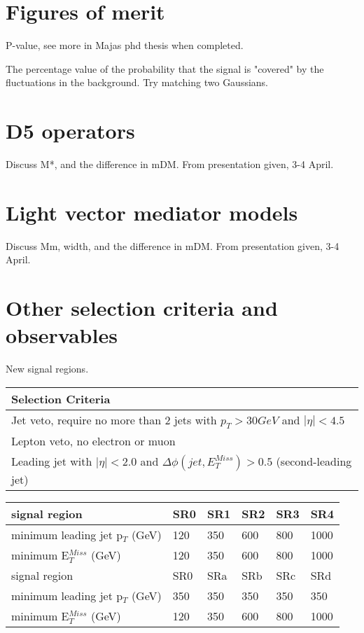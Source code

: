 \section{Figures of merit}
P-value, see more in Majas phd thesis when completed.

The percentage value of the probability that the signal is "covered" by the fluctuations in the background. Try matching two Gaussians.
\section{D5 operators}
Discuss M*, and the difference in mDM. From presentation given, 3-4 April. 
\section{Light vector mediator models}
Discuss Mm, width, and the difference in mDM. From presentation given, 3-4 April.
\section{Other selection criteria and observables}
New signal regions.
\begin{table}[h]
\begin{center}
\begin{tabular}{l}
\hline
Selection Criteria \\ \hline
Jet veto, require no more than 2 jets with $p_T > 30 GeV$ and $|\eta| < 4.5$ \\
Lepton veto, no electron or muon \\
Leading jet with $|\eta| < 2.0$ and $\Delta \phi (jet, E_T^{Miss})>0.5$ (second-leading jet) \\ \hline
\end{tabular}
\begin{tabular}{l l l l l l}
signal region & SR0 & SR1 & SR2 & SR3 & SR4 \\ \hline
minimum leading jet p$_T$ (GeV) & 120 & 350 & 600 & 800 & 1000 \\
minimum E$^{Miss}_T$ (GeV) & 120 & 350 & 600 & 800 & 1000 \\ \hline
signal region & SR0 & SRa & SRb & SRc & SRd \\ \hline
minimum leading jet p$_T$ (GeV) & 350 & 350 & 350 & 350 & 350 \\
minimum E$^{Miss}_T$ (GeV) & 120 & 350 & 600 & 800 & 1000 \\ \hline
\end{tabular}
\end{center}
\end{table}

